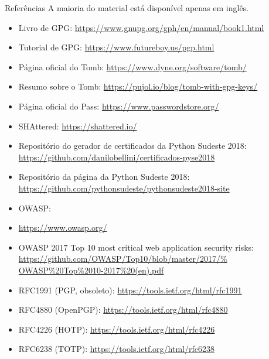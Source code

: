 \documentclass[utf8]{beamer}
\begin{document}
\begin{frame}{Referências}
  \fontsize{9pt}{9pt}\selectfont
  A maioria do material está disponível apenas em inglês.
  \begin{itemize}
    \item Livro de GPG:
          \url{https://www.gnupg.org/gph/en/manual/book1.html}
    \item Tutorial de GPG:
          \url{https://www.futureboy.us/pgp.html}
    \item Página oficial do Tomb:
          \url{https://www.dyne.org/software/tomb/}
    \item Resumo sobre o Tomb:
          \url{https://pujol.io/blog/tomb-with-gpg-keys/}
    \item Página oficial do Pass:
          \url{https://www.passwordstore.org/}
    \item SHAttered:
          \url{https://shattered.io/}
    \item Repositório do gerador de certificados
          da Python Sudeste 2018:
          \url{https://github.com/danilobellini/certificados-pyse2018}
    \item Repositório da página da Python Sudeste 2018:
          \url{https://github.com/pythonsudeste/pythonsudeste2018-site}
    \item OWASP:
    \item \url{https://www.owasp.org/}
    \item OWASP 2017
          Top 10 most critical web application security risks:
          \url{https://github.com/OWASP/Top10/blob/master/2017/%
               OWASP\%20Top\%2010-2017\%20(en).pdf}
    \item RFC1991 (PGP, obsoleto):
          \url{https://tools.ietf.org/html/rfc1991}
    \item RFC4880 (OpenPGP):
          \url{https://tools.ietf.org/html/rfc4880}
    \item RFC4226 (HOTP):
          \url{https://tools.ietf.org/html/rfc4226}
    \item RFC6238 (TOTP):
          \url{https://tools.ietf.org/html/rfc6238}
  \end{itemize}
  \vfill{}
\end{frame}
\end{document}
